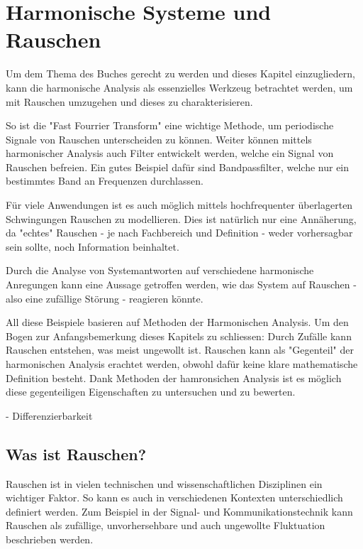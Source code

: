 %
%
%
%


\section{Harmonische Systeme und Rauschen\label{brown:Rauschen}}

Um dem Thema des Buches gerecht zu werden und dieses Kapitel einzugliedern, kann die harmonische Analysis als essenzielles Werkzeug betrachtet werden, um mit Rauschen umzugehen und dieses zu charakterisieren. 

So ist die "Fast Fourrier Transform" eine wichtige Methode, um periodische Signale von Rauschen unterscheiden zu können.
Weiter können mittels harmonischer Analysis auch Filter entwickelt werden, welche ein Signal von Rauschen befreien. Ein gutes Beispiel dafür sind Bandpassfilter, welche nur ein bestimmtes Band an Frequenzen durchlassen.

Für viele Anwendungen ist es auch möglich mittels hochfrequenter überlagerten Schwingungen Rauschen zu modellieren. Dies ist natürlich nur eine Annäherung, da "echtes" Rauschen - je nach Fachbereich und Definition - weder vorhersagbar sein sollte, noch Information beinhaltet. 

Durch die Analyse von Systemantworten auf verschiedene harmonische Anregungen kann eine Aussage getroffen werden, wie das System auf Rauschen - also eine zufällige Störung - reagieren könnte.

All diese Beispiele basieren auf Methoden der Harmonischen Analysis. Um den Bogen zur Anfangsbemerkung dieses Kapitels zu schliessen: Durch Zufälle kann Rauschen entstehen, was meist ungewollt ist. Rauschen kann als "Gegenteil" der harmonischen Analysis erachtet werden, obwohl dafür keine klare mathematische Definition besteht. Dank Methoden der hamronsichen Analysis ist es möglich diese gegenteiligen Eigenschaften zu untersuchen und zu bewerten.

- Differenzierbarkeit



\subsection{Was ist Rauschen?\label{brown:Rauschen:Arten}}
Rauschen ist in vielen technischen und wissenschaftlichen Disziplinen ein wichtiger Faktor. So kann es auch in verschiedenen Kontexten unterschiedlich definiert werden. 
Zum Beispiel in der Signal- und Kommunikationstechnik kann Rauschen als zufällige, unvorhersehbare und auch ungewollte Fluktuation beschrieben werden. 

